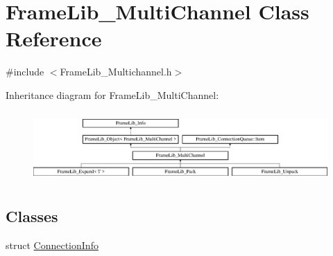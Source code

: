 \hypertarget{class_frame_lib___multi_channel}{}\section{Frame\+Lib\+\_\+\+Multi\+Channel Class Reference}
\label{class_frame_lib___multi_channel}


{\ttfamily \#include $<$Frame\+Lib\+\_\+\+Multichannel.\+h$>$}

Inheritance diagram for Frame\+Lib\+\_\+\+Multi\+Channel\+:\begin{figure}[H]
\begin{center}
\leavevmode
\includegraphics[height=2.715152cm]{class_frame_lib___multi_channel}
\end{center}
\end{figure}
\subsection*{Classes}
\begin{DoxyCompactItemize}
\item 
struct \hyperlink{struct_frame_lib___multi_channel_1_1_connection_info}{Connection\+Info}
\end{DoxyCompactItemize}
